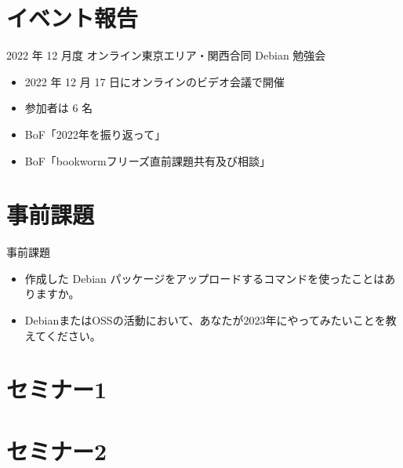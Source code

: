 \section{イベント報告}

\begin{frame}{2022 年 12 月度 オンライン東京エリア・関西合同 Debian 勉強会}
\begin{itemize}
\item 2022 年 12 月 17 日にオンラインのビデオ会議で開催
\item 参加者は 6 名
\item BoF「2022年を振り返って」
\item BoF「bookwormフリーズ直前課題共有及び相談」
\end{itemize}
\end{frame}


\section{事前課題}


\begin{frame}{事前課題}
  \begin{itemize}
  \item 作成した Debian パッケージをアップロードするコマンドを使ったことはありますか。
  \item DebianまたはOSSの活動において、あなたが2023年にやってみたいことを教えてください。
  \end{itemize}
\end{frame}

{\footnotesize
 
}

%

\section{セミナー1}

\section{セミナー2}


